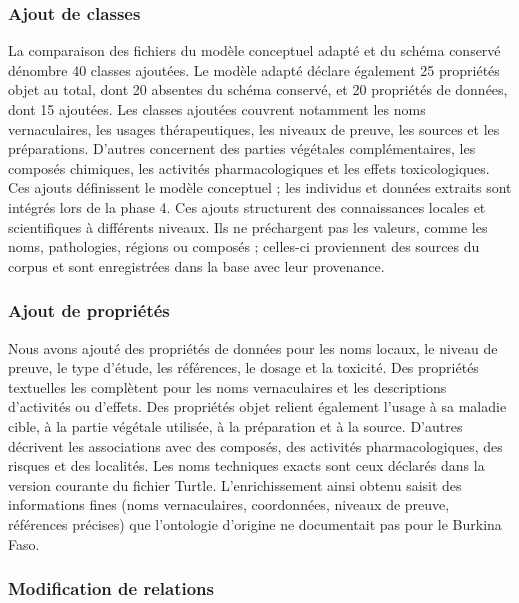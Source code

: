 \subsubsection{Ajout de classes}

La comparaison des fichiers du modèle conceptuel adapté et du schéma conservé dénombre 40 classes ajoutées. Le modèle adapté déclare également 25 propriétés objet au total, dont 20 absentes du schéma conservé, et 20 propriétés de données, dont 15 ajoutées. Les classes ajoutées couvrent notamment les noms vernaculaires, les usages thérapeutiques, les niveaux de preuve, les sources et les préparations. D'autres concernent des parties végétales complémentaires, les composés chimiques, les activités pharmacologiques et les effets toxicologiques. Ces ajouts définissent le modèle conceptuel ; les individus et données extraits sont intégrés lors de la phase 4. Ces ajouts structurent des connaissances locales et scientifiques à différents niveaux. Ils ne préchargent pas les valeurs, comme les noms, pathologies, régions ou composés ; celles-ci proviennent des sources du corpus et sont enregistrées dans la base avec leur provenance.

\subsubsection{Ajout de propriétés}

Nous avons ajouté des propriétés de données pour les noms locaux, le niveau de preuve, le type d'étude, les références, le dosage et la toxicité. Des propriétés textuelles les complètent pour les noms vernaculaires et les descriptions d'activités ou d'effets. Des propriétés objet relient également l'usage à sa maladie cible, à la partie végétale utilisée, à la préparation et à la source. D'autres décrivent les associations avec des composés, des activités pharmacologiques, des risques et des localités. Les noms techniques exacts sont ceux déclarés dans la version courante du fichier Turtle. L'enrichissement ainsi obtenu saisit des informations fines (noms vernaculaires, coordonnées, niveaux de preuve, références précises) que l'ontologie d'origine ne documentait pas pour le Burkina Faso.

\subsubsection{Modification de relations}

